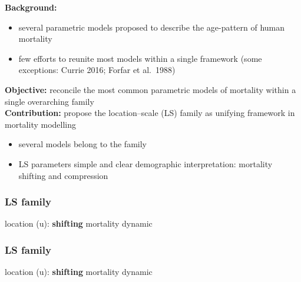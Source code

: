 \documentclass[12pt, xcolor=table]{beamer}  %
\begin{document}
\begin{frame} %
\textbf{Background:}
\begin{itemize}
\setlength\itemsep{0.5em}
\item several parametric models proposed to describe the age-pattern of human mortality $\,$ %
\item few efforts to reunite most models within a single framework \scriptsize{(some exceptions: Currie 2016; Forfar et al.~1988)}
\end{itemize}
\bigskip \pause
\textbf{Objective:} reconcile the most common parametric models of mortality within a single overarching family \\
\bigskip \pause
\textbf{Contribution:} propose the location--scale (LS) family as unifying framework in mortality modelling
\begin{itemize}
\setlength\itemsep{0.5em}
\item several models belong to the family %
\item LS parameters simple and clear demographic interpretation: mortality shifting and compression
\end{itemize}

\end{frame}

\begin{frame}\frametitle{LS family}
	\begin{center}
		\vspace{0.15cm}
		\normalsize {\color{white}location (u): \textbf{shifting} mortality dynamic} \\
	\end{center}
	
\end{frame}

\begin{frame}[noframenumbering]\frametitle{LS family}
	\begin{center}
		\vspace{0.15cm}
		\normalsize {\color{red}location (u)}: \textbf{shifting} mortality dynamic \\
	\end{center}
	
\end{frame}
\end{document}
